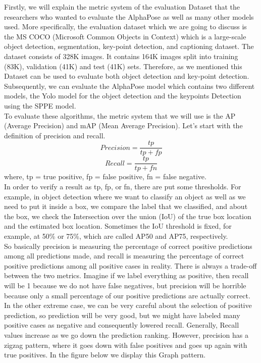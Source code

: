 Firstly, we will explain the metric system of the evaluation Dataset that the researchers who wanted to evaluate the AlphaPose as well as many other models used. More specifically, the evaluation dataset which we are going to discuss is the MS COCO \cite{MS COCO} (Microsoft Common Objects in Context) which is a large-scale object detection, segmentation, key-point detection, and captioning dataset. The dataset consists of 328K images. It contains 164K images split into training (83K), validation (41K) and test (41K) sets. Therefore, as we mentioned this Dataset can be used to evaluate both object detection and key-point detection. Subsequently, we can evaluate the AlphaPose model which contains two different models, the Yolo model for the object detection and the keypoints Detection using the SPPE model.\\

To evaluate these algorithms, the metric system that we will use is the AP \cite{AP} (Average Precision) and mAP (Mean Average Precision). Let's start with the definition of precision and recall. 
$$ Precision = \dfrac{tp}{tp+fp}$$
$$ Recall = \dfrac{tp}{tp+fn}$$
where, tp = true positive, fp = false positive, fn = false negative. \\

In order to verify a result as tp, fp, or fn, there are put some thresholds. For example, in object detection where we want to classify an object as well as we need to put it inside a box, we compare the label that we classified, and about the box, we check the Intersection over the union (IoU) of the true box location and the estimated box location. Sometimes the IoU threshold is fixed, for example, at 50\% or 75\%, which are called AP50 and AP75, respectively.\\

So basically precision is measuring the percentage of correct positive predictions among all predictions made, and recall is measuring the percentage of correct positive predictions among all positive cases in reality. There is always a trade-off between the two metrics. Imagine if we label everything as positive, then recall will be 1 because we do not have false negatives, but precision will be horrible because only a small percentage of our positive predictions are actually correct. In the other extreme case, we can be very careful about the selection of positive prediction, so prediction will be very good, but we might have labeled many positive cases as negative and consequently lowered recall. Generally, Recall values increase as we go down the prediction ranking. However, precision has a zigzag pattern, where it goes down with false positives and goes up again with true positives. In the figure below we display this Graph pattern.\\

